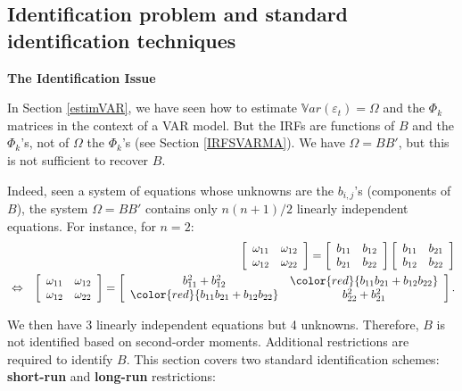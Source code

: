\documentclass[
  12pt,
]{book}
\theoremstyle{definition}
\theoremstyle{definition}
\theoremstyle{definition}
\theoremstyle{definition}
\theoremstyle{remark}
\begin{document}
\hypertarget{identification-problem-and-standard-identification-techniques}{%
\subsection{Identification problem and standard identification techniques}\label{identification-problem-and-standard-identification-techniques}}

\textbf{The Identification Issue}

In Section \ref{estimVAR}, we have seen how to estimate \(\mathbb{V}ar(\varepsilon_t) =\Omega\) and the \(\Phi_k\) matrices in the context of a VAR model. But the IRFs are functions of \(B\) and the \(\Phi_k\)'s, not of \(\Omega\) the \(\Phi_k\)'s (see Section \ref{IRFSVARMA}). We have \(\Omega = BB'\), but this is not sufficient to recover \(B\).

Indeed, seen a system of equations whose unknowns are the \(b_{i,j}\)'s (components of \(B\)), the system \(\Omega = BB'\) contains only \(n(n+1)/2\) linearly independent equations. For instance, for \(n=2\):
\begin{eqnarray*}
&&\left[
\begin{array}{cc}
\omega_{11} & \omega_{12} \\
\omega_{12} & \omega_{22}
\end{array}
\right] = \left[
\begin{array}{cc}
b_{11} & b_{12} \\
b_{21} & b_{22}
\end{array}
\right]\left[
\begin{array}{cc}
b_{11} & b_{21} \\
b_{12} & b_{22}
\end{array}
\right]\\
&\Leftrightarrow&\left[
\begin{array}{cc}
\omega_{11} & \omega_{12} \\
\omega_{12} & \omega_{22}
\end{array}
\right] = \left[
\begin{array}{cc}
b_{11}^2+b_{12}^2 & \color{red}{b_{11}b_{21}+b_{12}b_{22}} \\
\color{red}{b_{11}b_{21}+b_{12}b_{22}} & b_{22}^2 + b_{21}^2
\end{array}
\right].
\end{eqnarray*}

We then have 3 linearly independent equations but 4 unknowns. Therefore, \(B\) is not identified based on second-order moments. Additional restrictions are required to identify \(B\). This section covers two standard identification schemes: \textbf{short-run} and \textbf{long-run} restrictions:
\end{document}
